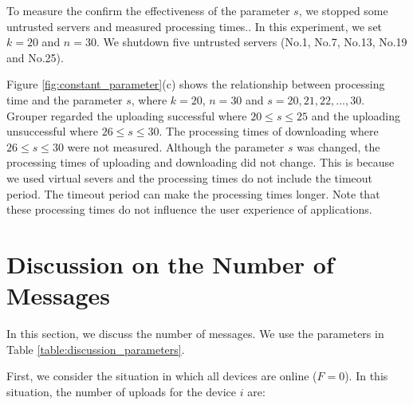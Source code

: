 \documentclass[a4paper,11pt]{report}
\begin{document}
To measure the confirm the effectiveness of the parameter $s$, we stopped some untrusted servers and measured processing times..
In this experiment, we set $k = 20$ and $n = 30$.
We shutdown five untrusted servers (No.1, No.7, No.13, No.19 and No.25).

Figure \ref{fig:constant_parameter}(c) shows the relationship between processing time and the parameter $s$, where $k = 20$, $n = 30$ and $s = 20, 21, 22, ... , 30$.
Grouper regarded the uploading successful where $20 \leq s \leq 25$ and the uploading unsuccessful where $26 \leq s \leq 30$.
The processing times of downloading where $26 \leq s \leq 30$ were not measured.
Although the parameter $s$  was changed, the processing times of uploading and downloading did not change.
This is because we used virtual severs and the processing times do not include the timeout period.
The timeout period can make the processing times longer. 
Note that these processing times do not influence the user experience of applications.

\section{Discussion on the Number of Messages} \label{section:discussion}

In this section, we discuss the number of messages. 
We use the parameters in Table \ref{table:discussion_parameters}.

First, we consider the situation in which all devices are online ($F=0$).
In this situation, the number of uploads for the device $i$ are:
\end{document}
